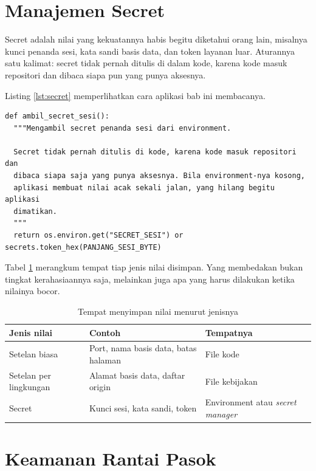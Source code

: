 \section{Manajemen Secret}

Secret adalah nilai yang kekuatannya habis begitu diketahui orang lain,
misalnya kunci penanda sesi, kata sandi basis data, dan token layanan luar.
Aturannya satu kalimat: secret tidak pernah ditulis di dalam kode, karena
kode masuk repositori dan dibaca siapa pun yang punya aksesnya.

Listing \ref{lst:secret} memperlihatkan cara aplikasi bab ini membacanya.

\begin{lstlisting}[style=PythonStyle, caption={Secret dibaca dari environment, bukan dari kode, tersedia di \berkas{sources/chapter07/aplikasi.py}}, label={lst:secret}]
def ambil_secret_sesi():
  """Mengambil secret penanda sesi dari environment.

  Secret tidak pernah ditulis di kode, karena kode masuk repositori dan
  dibaca siapa saja yang punya aksesnya. Bila environment-nya kosong,
  aplikasi membuat nilai acak sekali jalan, yang hilang begitu aplikasi
  dimatikan.
  """
  return os.environ.get("SECRET_SESI") or secrets.token_hex(PANJANG_SESI_BYTE)
\end{lstlisting}

Tabel \ref{tab:secret} merangkum tempat tiap jenis nilai disimpan. Yang
membedakan bukan tingkat kerahasiaannya saja, melainkan juga apa yang harus
dilakukan ketika nilainya bocor.

\begin{table}[!htb]
  \centering
  \caption{Tempat menyimpan nilai menurut jenisnya}
  \label{tab:secret}
  \begin{tabularx}{\textwidth}{lXl}
    \hline
    \textbf{Jenis nilai} & \textbf{Contoh} & \textbf{Tempatnya} \\
    \hline
    Setelan biasa & Port, nama basis data, batas halaman & File kode \\
    \hline
    Setelan per lingkungan & Alamat basis data, daftar origin & File kebijakan \\
    \hline
    Secret & Kunci sesi, kata sandi, token & Environment atau \textit{secret manager} \\
    \hline
  \end{tabularx}
\end{table}

\section{Keamanan Rantai Pasok}

